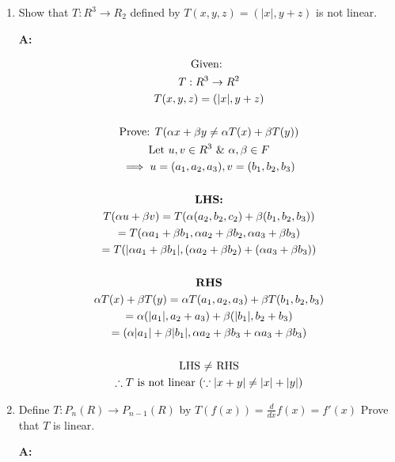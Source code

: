 \documentclass[english,course,fleqn]{lecture}
\newenvironment{qanda}{\begin{enumerate}\setlength{\parindent}{0pt}}{\medskip\end{enumerate}}
\newcommand{\Q}{\bigskip\bfseries \item}
\newcommand{\A}{\par\textbf{A:} \normalfont}
\begin{document}
\begin{qanda}
	\Q Show that $T:R^{3} \rightarrow R_{2}$ defined by $T(x,y,z) = (|x|,y+z)$ is not linear.


  \A 

  \begin{gather*}
    \text{Given: }\\
    T: R^{3} \rightarrow R^{2}\\
    T(x,y,z) = (|x|, y + z)\\
    \\
    \text{Prove: $T(\alpha x + \beta y \ne \alpha T(x) + \beta T(y))$}\\
    \text{Let } u,v \in R^{3} ~\&~ \alpha, \beta \in F\\
    \implies u = (a_{1}, a_{2}, a_{3}), v = (b_{1}, b_{2}, b_{3})\\
    \\
    \text{\textbf{LHS:}}\\
    T(\alpha u + \beta v) = T(\alpha(a_{2}, b_{2}, c_{2}) + \beta (b_{1}, b_{2}, b_{3}))\\
    =T(\alpha a_{1} + \beta b_{1}, \alpha a_{2} + \beta b_{2}, \alpha a_{3} + \beta b_{3})\\
    = T(|\alpha a_{1} + \beta b_{1}|, (\alpha a_{2} + \beta b_{2}) + (\alpha a_{3} + \beta b_{3}))\\
    \\
    \text{\textbf{RHS}}\\
    \alpha T(x) + \beta T(y) = \alpha T(a_{1}, a_{2}, a_{3}) + \beta T(b_{1}, b_{2}, b_{3})\\
  = \alpha(|a_{1}| , a_{2} + a_{3}) + \beta (|b_{1}|, b_{2} + b_{3})\\
  = (\alpha | a_{1}| + \beta |b_{1}|, \alpha a_{2} + \beta b_{3} + \alpha a_{3} + \beta b_{3})\\
  \\
  \text{LHS $\ne$ RHS}\\
  \therefore \text{$T$ is not linear } ( \because |x + y| \ne |x| + |y| )
  \end{gather*}

  \Q Define $T:P_{n}(R) \rightarrow P_{n-1}(R)$ by $T(f(x)) = \frac{d}{dx}{f(x)} = f'(x)$
  Prove that $T$ is linear.

  \A


\end{qanda}
\end{document}
